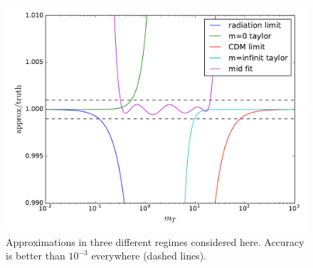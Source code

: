 \documentclass[12pt]{article}
\begin{document}
\begin{figure}
  \centering
  \includegraphics[width=\linewidth]{./fitfig.pdf}
  \caption{Approximations in three different regimes considered
    here. Accuracy is better than $10^{-3}$ everywhere (dashed lines).}
  \label{fig:approx}
\end{figure}
\end{document}
